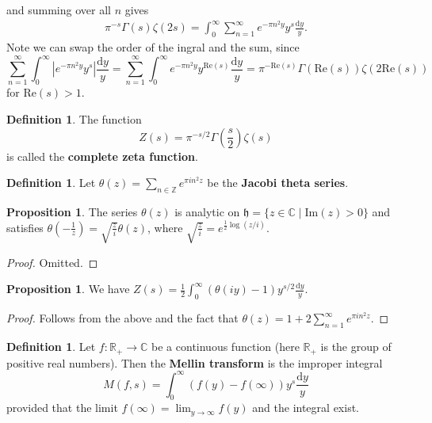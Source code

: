\documentclass{article}
\theoremstyle{definition}
\newtheorem{prop}[theorem]{Proposition}
\newtheorem{defn}[theorem]{Definition}
\begin{document}
and summing over all $n$ gives 
\begin{align*}
    \pi^{-s}\Gamma(s)\zeta(2s) = \int_{0}^{\infty} \sum_{n=1}^{\infty} e^{-\pi n^2 y} y^s \frac{\mathrm{d}y}{y}.
\end{align*}
Note we can swap the order of the ingral and the sum, since \[
\sum_{n=1}^{\infty} \int_{0}^{\infty} \left|e^{-\pi n^2 y}y^s\right|\frac{\mathrm{d}y}{y} = \sum_{n=1}^{\infty} \int_{0}^{\infty} e^{-\pi n^2 y}y^{\text{Re}(s)}\frac{\mathrm{d}y}{y} = \pi^{-\text{Re}(s)}\Gamma(\text{Re}(s))\zeta(2\text{Re}(s))
\]
for $\text{Re}(s)>1$.
\begin{defn}\label{defn2.13}
    The function \[
    Z(s) = \pi^{-s/2}\Gamma \left(\frac{s}{2}\right) \zeta(s)
    \]
    is called the \textbf{complete zeta function}.
\end{defn}
\begin{defn}\label{defn2.14}
    Let $\theta(z) = \sum_{n \in \mathbb{Z}} e^{\pi i n^2 z}$ be the \textbf{Jacobi theta series}.
\end{defn}
\begin{prop}\label{prop2.15}
    The series $\theta(z)$ is analytic on $\mathfrak{h} = \{z \in \mathbb{C} \mid \text{Im}(z)>0\}$ and satisfies $\theta \left(-\frac{1}{z}\right) = \sqrt{\frac{z}{i}}\theta(z)$, where $\sqrt{\frac{z}{i}} = e^{\frac{1}{2}\log(z/i)}$.
\end{prop}
\begin{proof}
    Omitted.
\end{proof}
\begin{prop}\label{prop2.16}
    We have $Z(s) = \frac{1}{2}\int_{0}^{\infty} \left(\theta(iy)-1\right) y^{s/2} \frac{\mathrm{d}y}{y}$.
\end{prop}
\begin{proof}
    Follows from the above and the fact that $\theta(z) = 1 + 2 \sum_{n=1}^{\infty} e^{\pi i n^2 z}$.
\end{proof}
\begin{defn}\label{defn2.17}
    Let $f : \mathbb{R}_+ \to \mathbb{C}$ be a continuous function (here $\mathbb{R}_+$ is the group of positive real numbers). Then the \textbf{Mellin transform} is the improper integral \[
    M(f,s) = \int_{0}^{\infty} (f(y)-f(\infty))y^s \frac{\mathrm{d}y}{y} 
    \]
    provided that the limit $f(\infty) = \lim_{y \to \infty}f(y)$ and the integral exist.
\end{defn}
\end{document}
